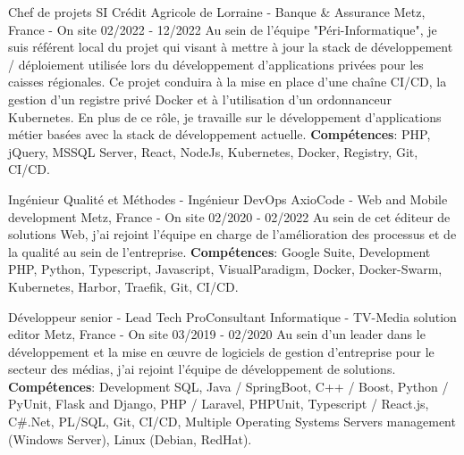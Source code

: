 \begin{cventries}
  \cventry
    {Chef de projets SI} %
    {Crédit Agricole de Lorraine - Banque \& Assurance} %
    {Metz, France - On site} %
    {02/2022 - 12/2022} %
    {
      Au sein de l'équipe "Péri-Informatique", je suis référent local du projet qui visant à mettre à jour 
      la stack de développement / déploiement utilisée lors du développement d'applications privées pour 
      les caisses régionales.
      \newline
      Ce projet conduira à la mise en place d'une chaîne CI/CD, la gestion d'un registre privé Docker et à 
      l'utilisation d'un ordonnanceur Kubernetes.
      \newline
      En plus de ce rôle, je travaille sur le développement d'applications métier basées avec la stack de 
      développement actuelle.
      \newline
      \textbf{Compétences}: PHP, jQuery, MSSQL Server, React, NodeJs, Kubernetes, Docker, Registry, Git, CI/CD.
    }

  \cventry
    {Ingénieur Qualité et Méthodes - Ingénieur DevOps} %
    {AxioCode - Web and Mobile development} %
    {Metz, France - On site} %
    {02/2020 - 02/2022} %
    {
      Au sein de cet éditeur de solutions Web, j'ai rejoint l'équipe en charge de l'amélioration des processus 
      et de la qualité au sein de l'entreprise.
      \newline
      \textbf{Compétences}: Google Suite, Development PHP, Python, Typescript, Javascript, VisualParadigm, Docker, Docker-Swarm, Kubernetes, Harbor, Traefik, Git, CI/CD.
    }

  \cventry
    {Développeur senior - Lead Tech} %
    {ProConsultant Informatique - TV-Media solution editor} %
    {Metz, France - On site} %
    {03/2019 - 02/2020} %
    {
      Au sein d'un leader dans le développement et la mise en œuvre de logiciels de gestion 
      d'entreprise pour le secteur des médias, j'ai rejoint l'équipe de développement de 
      solutions.
      \newline
      \textbf{Compétences}: Development SQL, Java / SpringBoot, C++ / Boost, Python / PyUnit, Flask and Django, PHP / Laravel, PHPUnit, Typescript / React.js, C\#.Net, PL/SQL, Git, CI/CD, Multiple Operating Systems Servers management (Windows Server), Linux (Debian, RedHat).
    }


\end{cventries}
